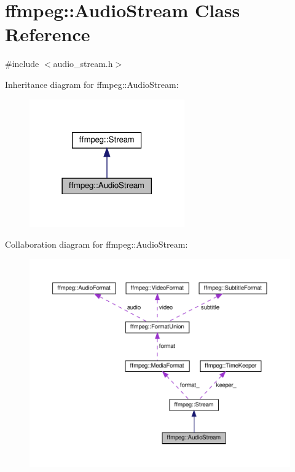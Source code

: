 \hypertarget{classffmpeg_1_1AudioStream}{}\section{ffmpeg\+:\+:Audio\+Stream Class Reference}
\label{classffmpeg_1_1AudioStream}


{\ttfamily \#include $<$audio\+\_\+stream.\+h$>$}



Inheritance diagram for ffmpeg\+:\+:Audio\+Stream\+:
\nopagebreak
\begin{figure}[H]
\begin{center}
\leavevmode
\includegraphics[width=189pt]{classffmpeg_1_1AudioStream__inherit__graph}
\end{center}
\end{figure}


Collaboration diagram for ffmpeg\+:\+:Audio\+Stream\+:
\nopagebreak
\begin{figure}[H]
\begin{center}
\leavevmode
\includegraphics[width=350pt]{classffmpeg_1_1AudioStream__coll__graph}
\end{center}
\end{figure}
